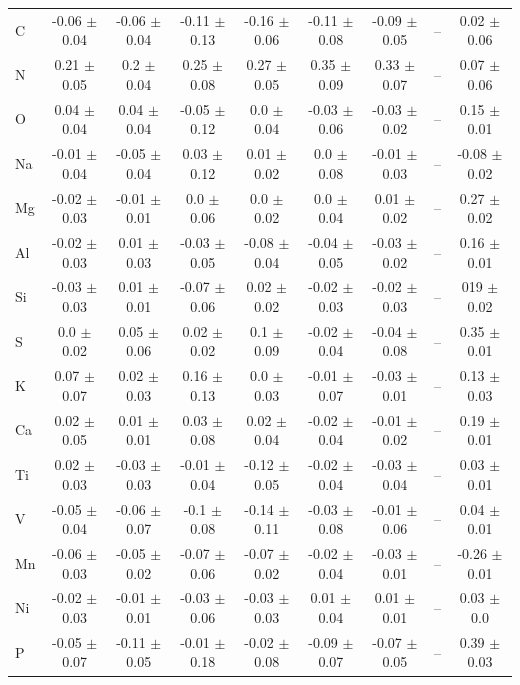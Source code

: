 \documentclass[14pt, preprint2]{aastex6}
\begin{document}
\begin{table}[!h]
\begin{tabular}{ | p{} | c| c | c | c | c | c | c | c | }
C & -0.06 $\pm$ 0.04  &-0.06 $\pm$ 0.04 & -0.11 $\pm$ 0.13 & -0.16 $\pm$ 0.06 & -0.11 $\pm$ 0.08 &  -0.09 $\pm$ 0.05 & -- & 0.02 $\pm$ 0.06 \\
N &  0.21 $\pm$ 0.05 & 0.2 $\pm$ 0.04 & 0.25 $\pm$ 0.08  & 0.27 $\pm$ 0.05 & 0.35 $\pm$ 0.09  & 0.33 $\pm$ 0.07  & -- &  0.07 $\pm$ 0.06 \\
O & 0.04 $\pm$ 0.04 &0.04 $\pm$ 0.04 &  -0.05 $\pm$ 0.12  & 0.0 $\pm$ 0.04 & -0.03 $\pm$ 0.06 & -0.03 $\pm$ 0.02 & --  & 0.15 $\pm$ 0.01 \\
Na & -0.01 $\pm$ 0.04 & -0.05 $\pm$ 0.04 & 0.03 $\pm$ 0.12   & 0.01 $\pm$ 0.02  & 0.0 $\pm$ 0.08  & -0.01 $\pm$ 0.03 & --  &  -0.08 $\pm$ 0.02\\
Mg  & -0.02 $\pm$ 0.03 & -0.01 $\pm$ 0.01 & 0.0 $\pm$ 0.06   &0.0 $\pm$ 0.02 & 0.0 $\pm$ 0.04 & 0.01 $\pm$ 0.02 & --  &  0.27 $\pm$ 0.02\\
Al  & -0.02 $\pm$ 0.03 & 0.01 $\pm$ 0.03  & -0.03 $\pm$ 0.05 & -0.08 $\pm$ 0.04 & -0.04 $\pm$ 0.05  & -0.03 $\pm$ 0.02  &  -- &  0.16 $\pm$ 0.01\\
Si & -0.03 $\pm$ 0.03 & 0.01 $\pm$ 0.01 & -0.07 $\pm$ 0.06  & 0.02 $\pm$ 0.02 & -0.02 $\pm$ 0.03 & -0.02 $\pm$ 0.03 &  -- &  019 $\pm$ 0.02\\
S & 0.0 $\pm$ 0.02 &  0.05 $\pm$ 0.06 &  0.02 $\pm$ 0.02 & 0.1 $\pm$ 0.09 & -0.02 $\pm$ 0.04 &-0.04 $\pm$ 0.08  &  -- &  0.35 $\pm$ 0.01\\
K & 0.07 $\pm$ 0.07  &  0.02 $\pm$ 0.03  & 0.16 $\pm$ 0.13 & 0.0 $\pm$ 0.03 &  -0.01 $\pm$ 0.07   &-0.03 $\pm$ 0.01 &  -- &  0.13 $\pm$ 0.03\\
Ca & 0.02 $\pm$ 0.05  &  0.01 $\pm$ 0.01 & 0.03 $\pm$ 0.08  & 0.02 $\pm$ 0.04 & -0.02 $\pm$ 0.04 & -0.01 $\pm$ 0.02 &  -- &  0.19 $\pm$ 0.01\\
Ti & 0.02 $\pm$ 0.03  &  -0.03 $\pm$ 0.03  &  -0.01 $\pm$ 0.04  & -0.12 $\pm$ 0.05 & -0.02 $\pm$ 0.04 & -0.03 $\pm$ 0.04 & --  &  0.03 $\pm$ 0.01\\
V & -0.05 $\pm$ 0.04 &  -0.06 $\pm$ 0.07 &  -0.1 $\pm$ 0.08  & -0.14 $\pm$ 0.11  &  -0.03 $\pm$ 0.08 & -0.01 $\pm$ 0.06  &  -- &  0.04 $\pm$ 0.01\\
Mn & -0.06 $\pm$ 0.03 & -0.05 $\pm$ 0.02  &   -0.07 $\pm$ 0.06 & -0.07 $\pm$ 0.02 & -0.02 $\pm$ 0.04 &-0.03 $\pm$ 0.01 & --  & -0.26 $\pm$ 0.01 \\
Ni & -0.02 $\pm$ 0.03 & -0.01 $\pm$ 0.01 &  -0.03 $\pm$ 0.06 & -0.03 $\pm$ 0.03 & 0.01 $\pm$ 0.04  & 0.01 $\pm$ 0.01 & --  & 0.03 $\pm$ 0.0 \\
P & -0.05 $\pm$ 0.07 &  -0.11 $\pm$ 0.05  &  -0.01 $\pm$ 0.18 & -0.02 $\pm$ 0.08 & -0.09 $\pm$ 0.07 & -0.07 $\pm$ 0.05  &  -- & 0.39 $\pm$ 0.03 \\

\end{tabular}
\end{table}
\end{document}
